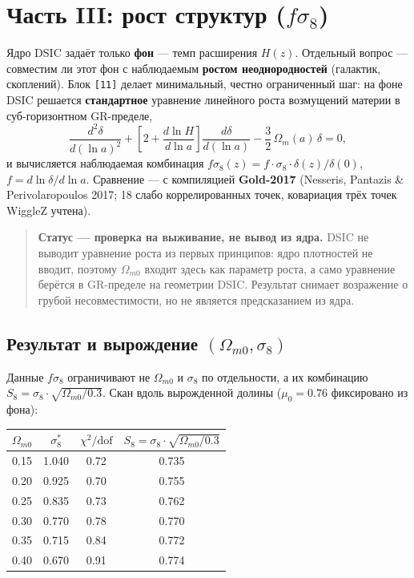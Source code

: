 \documentclass{article}
\begin{document}
\section{Часть III: рост структур ($f\sigma_8$)}

Ядро DSIC задаёт только \textbf{фон} --- темп расширения $H(z)$. Отдельный вопрос --- совместим ли этот фон с наблюдаемым \textbf{ростом неоднородностей} (галактик, скоплений). Блок \texttt{[11]} делает минимальный, честно ограниченный шаг: на фоне DSIC решается \textbf{стандартное} уравнение линейного роста возмущений материи в суб-горизонтном GR-пределе,
\begin{equation*}
\frac{d^2\delta}{d(\ln a)^2} + \left[2 + \frac{d\ln H}{d\ln a}\right]\frac{d\delta}{d(\ln a)} - \frac{3}{2}\,\Omega_m(a)\,\delta = 0,
\end{equation*}
и вычисляется наблюдаемая комбинация $f\sigma_8(z) = f\cdot\sigma_8\cdot\delta(z)/\delta(0)$, $f = d\ln\delta/d\ln a$. Сравнение --- с компиляцией \textbf{Gold-2017} (Nesseris, Pantazis \& Perivolaropoulos 2017; 18 слабо коррелированных точек, ковариация трёх точек WiggleZ учтена).

\begin{quote}
\textbf{Статус --- проверка на выживание, не вывод из ядра.} DSIC не выводит уравнение роста из первых принципов: ядро плотностей не вводит, поэтому $\Omega_{m0}$ входит здесь как параметр роста, а само уравнение берётся в GR-пределе на геометрии DSIC. Результат снимает возражение о грубой несовместимости, но не является предсказанием из ядра.
\end{quote}

\subsection{Результат и вырождение $(\Omega_{m0}, \sigma_8)$}

Данные $f\sigma_8$ ограничивают не $\Omega_{m0}$ и $\sigma_8$ по отдельности, а их комбинацию $S_8 = \sigma_8\cdot\sqrt{\Omega_{m0}/0.3}$. Скан вдоль вырожденной долины ($\mu_0 = 0.76$ фиксировано из фона):

\begin{center}
\small
\begin{tabular}{@{}cccc@{}}
\toprule
$\Omega_{m0}$ & $\sigma_8^*$ & $\chi^2/\text{dof}$ & $S_8 = \sigma_8\cdot\sqrt{\Omega_{m0}/0.3}$ \\
\midrule
0.15 & 1.040 & 0.72 & 0.735 \\
0.20 & 0.925 & 0.70 & 0.755 \\
0.25 & 0.835 & 0.73 & 0.762 \\
0.30 & 0.770 & 0.78 & 0.770 \\
0.35 & 0.715 & 0.84 & 0.772 \\
0.40 & 0.670 & 0.91 & 0.774 \\
\bottomrule
\end{tabular}
\end{center}
\end{document}
